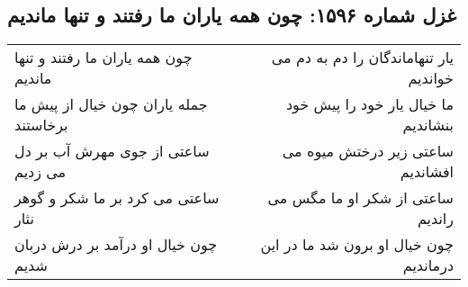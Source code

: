 \begin{center}
\section*{غزل شماره ۱۵۹۶: چون همه یاران ما رفتند و تنها ماندیم}
\label{sec:1596}
\begin{longtable}{l p{0.5cm} r}
چون همه یاران ما رفتند و تنها ماندیم
&&
یار تنهاماندگان را دم به دم می خواندیم
\\
جمله یاران چون خیال از پیش ما برخاستند
&&
ما خیال یار خود را پیش خود بنشاندیم
\\
ساعتی از جوی مهرش آب بر دل می زدیم
&&
ساعتی زیر درختش میوه می افشاندیم
\\
ساعتی می کرد بر ما شکر و گوهر نثار
&&
ساعتی از شکر او ما مگس می راندیم
\\
چون خیال او درآمد بر درش دربان شدیم
&&
چون خیال او برون شد ما در این درماندیم
\\
\end{longtable}
\end{center}
